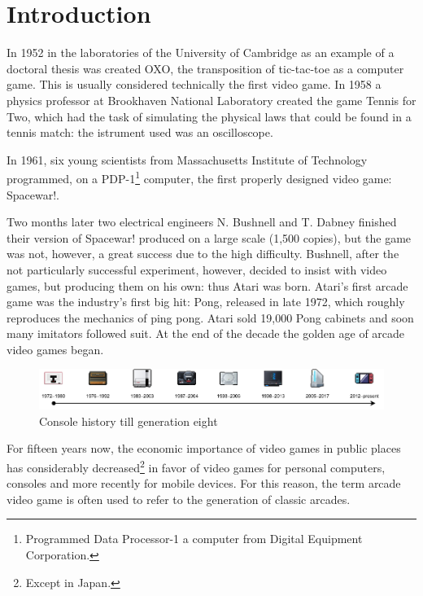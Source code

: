 \chapter{Introduction}
\label{cap:introduction}

In 1952 in the laboratories of the University of Cambridge as an example of a doctoral thesis was created OXO, the transposition of tic-tac-toe as a computer game. This is usually considered technically the first video game. In 1958 a physics professor at Brookhaven National Laboratory created the game Tennis for Two, which had the task of simulating the physical laws that could be found in a tennis match: the istrument used was an oscilloscope.

In 1961, six young scientists from Massachusetts Institute of Technology programmed, on a PDP-1\footnote{Programmed Data Processor-1 a computer from Digital Equipment Corporation.} computer, the first properly designed video game: Spacewar!.

Two months later two electrical engineers N. Bushnell and T. Dabney finished their version of Spacewar! produced on a large scale (1,500 copies), but the game was not, however, a great success due to the high difficulty. Bushnell, after the not particularly successful experiment, however, decided to insist with video games, but producing them on his own: thus Atari was born. Atari's first arcade game was the industry's first big hit: Pong, released in late 1972, which roughly reproduces the mechanics of ping pong. Atari sold 19,000 Pong cabinets and soon many imitators followed suit. At the end of the decade the golden age of arcade video games began.

\begin{figure}[H]
	\includegraphics[width=\linewidth]{immagini/consoles_history}
	\caption{Console history till generation eight}
	\label{fig:consoles_history}
\end{figure}

For fifteen years now, the economic importance of video games in public places has considerably decreased\footnote{Except in Japan.} in favor of video games for personal computers, consoles and more recently for mobile devices. For this reason, the term arcade video game is often used to refer to the generation of classic arcades\cite{High_Score}.


